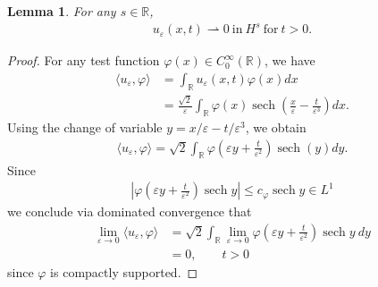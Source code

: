 \documentclass[12pt,reqno]{amsart}
\numberwithin{equation}{section}  %
\newcommand{\rr}{\mathbb{R}}
\newcommand{\ee}{\varepsilon}
\newcommand{\vp}{\varphi}
\DeclareMathOperator{\sech}{sech}
\newtheorem{lemma}[theorem]{Lemma}
\begin{document}
        \begin{lemma}
        For any $s \in \rr$,
        \begin{equation*}
        \begin{split}
          u_{\ee}(x,t) \rightharpoonup 0 \ \text{in} \ H^{s} \ \text{for} \ t>
          0.
        \end{split}
        \end{equation*}
        \label{lem:weak-conv}
        \end{lemma}
        \begin{proof}
          For any test function $\vp(x) \in C_{0}^{\infty}(\rr)$, we have
          \begin{equation*}
          \begin{split}
            \langle u_{\ee}, \vp \rangle 
            & = \int_{\rr} u_{\ee}(x,t) \vp(x) dx
            \\
            & = \frac{\sqrt{2}}{\ee} \int_{\rr} \vp(x) \sech\left( \frac{x}{\ee}
            - \frac{t}{\ee^{3}}
            \right) dx.
          \end{split}
          \end{equation*}
          Using the change of variable $y = x/\ee - t/\ee^{3}$, we obtain
          \begin{equation*}
          \begin{split}
            \langle u_{\ee}, \vp \rangle = \sqrt{2} \int_{\rr} \vp\left( \ee y +
            \frac{t}{\ee^{2}} 
            \right)\sech(y) dy.
          \end{split}
          \end{equation*}
          Since
          \begin{equation*}
          \begin{split}
            | \vp\left( \ee y + \frac{t}{\ee^{2}} \right) \sech y | \le
            c_{\vp} \sech y \in L^{1}
          \end{split}
          \end{equation*}
           we conclude via dominated convergence that
          \begin{equation*}
          \begin{split}
            \lim_{\ee \to 0} \langle u_{\ee}, \vp \rangle  
            & = \sqrt{2} \int_{\rr} \lim_{\ee \to 0} \vp\left( \ee y +
            \frac{t}{\ee^{2}} \right) \sech y \ dy
            \\
            & = 0, \qquad t > 0
          \end{split}
          \end{equation*}
          since $\vp$ is compactly supported.
        \end{proof}
\end{document}
